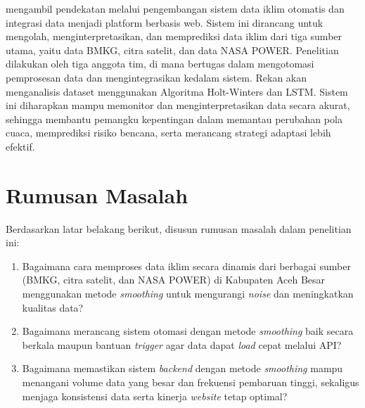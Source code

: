     \Saya{} mengambil pendekatan melalui pengembangan sistem data iklim otomatis dan integrasi data menjadi platform berbasis web. Sistem ini dirancang untuk mengolah, menginterpretasikan, dan memprediksi data iklim dari tiga sumber utama, yaitu data BMKG, citra satelit, dan data NASA POWER. Penelitian dilakukan oleh tiga anggota tim, di mana \saya{} bertugas dalam mengotomasi pemprosesan data dan mengintegrasikan kedalam sistem. Rekan \saya{} akan menganalisis dataset menggunakan Algoritma Holt-Winters dan LSTM. Sistem ini diharapkan mampu memonitor dan menginterpretasikan data secara akurat, sehingga membantu pemangku kepentingan dalam memantau perubahan pola cuaca, memprediksi risiko bencana, serta merancang strategi adaptasi lebih efektif.
    
\section{Rumusan Masalah}
Berdasarkan latar belakang berikut, disusun rumusan masalah dalam penelitian ini:

\begin{enumerate}
    \item Bagaimana cara memproses data iklim secara dinamis dari berbagai sumber (BMKG, citra satelit, dan NASA POWER) di Kabupaten Aceh Besar menggunakan metode \textit{smoothing} untuk mengurangi \textit{noise} dan meningkatkan kualitas data?

    \item Bagaimana merancang sistem otomasi dengan metode \textit{smoothing} baik secara berkala maupun bantuan \textit{trigger} agar data dapat \textit{load} cepat melalui API?

    \item Bagaimana memastikan sistem \textit{backend} dengan metode \textit{smoothing} mampu menangani volume data yang besar dan frekuensi pembaruan tinggi, sekaligus menjaga konsistensi data serta kinerja \textit{website} tetap optimal? 
\end{enumerate}

